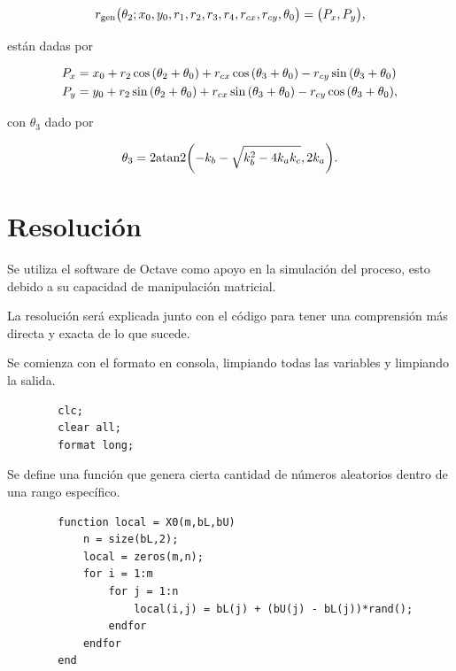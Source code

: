 \documentclass[a4paper, 12pt]{article}
\begin{document}
    \begin{equation*}
        r_\text{gen} \qty(\theta_2; x_0, y_0, r_1, r_2, r_3, r_4, r_{cx}, r_{cy}, \theta_0) = \qty(P_x, P_y),
    \end{equation*}

    están dadas por

    \begin{align*}
        P_x &= x_0 + r_2 \cos \qty(\theta_2 + \theta_0) + r_{cx} \cos \qty(\theta_3 + \theta_0) - r_{cy} \sin \qty(\theta_3 + \theta_0) \\
        P_y &= y_0 + r_2 \sin \qty(\theta_2 + \theta_0) + r_{cx} \sin \qty(\theta_3 + \theta_0) - r_{cy} \cos \qty(\theta_3 + \theta_0), \\
    \end{align*}

    con $\theta_3$ dado por

    \begin{equation*}
        \theta_3 = 2 \text{atan}2 \qty(-k_b - \sqrt{k_b^2 - 4 k_a k_c}, 2k_a).
    \end{equation*}

    \section{Resolución}

    Se utiliza el software de Octave como apoyo en la simulación del proceso, esto debido a su capacidad de manipulación matricial.

    La resolución será explicada junto con el código para tener una comprensión más directa y exacta de lo que sucede.

    Se comienza con el formato en consola, limpiando todas las variables y limpiando la salida.

    \begin{verbatim}
        clc;
        clear all;
        format long;
    \end{verbatim}

    Se define una función que genera cierta cantidad de números aleatorios dentro de una rango específico.

    \begin{verbatim}
        function local = X0(m,bL,bU)
            n = size(bL,2);
            local = zeros(m,n);
            for i = 1:m
                for j = 1:n
                    local(i,j) = bL(j) + (bU(j) - bL(j))*rand();
                endfor
            endfor
        end
    \end{verbatim}
\end{document}
